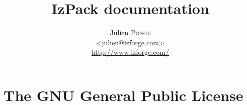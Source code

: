 \documentclass[a4paper, 12pt]{report}
\title{\Huge{\textbf{IzPack documentation}}}
\author{Julien \textsc{Ponge} \\
				\url{<julien@izforge.com>} \\
				\url{http://www.izforge.com/}}
\begin{document}
  \maketitle
  \tableofcontents

  
  
  
  
  
  
  
  \appendix
  \chapter{The GNU General Public License}
  \footnotesize
  
  \normalsize
\end{document}

